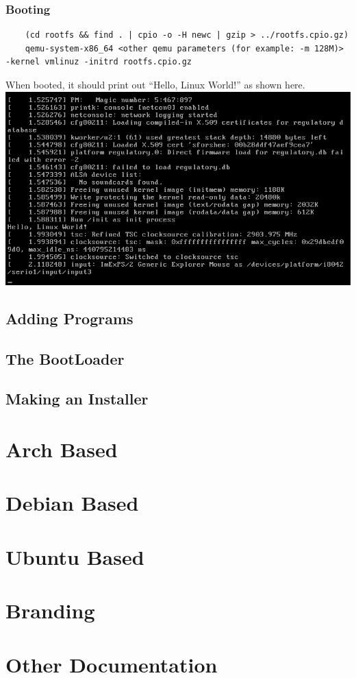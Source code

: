 \documentclass{article}
\begin{document}
			\subsubsection{Booting}
			\begin{lstlisting}
	(cd rootfs && find . | cpio -o -H newc | gzip > ../rootfs.cpio.gz)
	qemu-system-x86_64 <other qemu parameters (for example: -m 128M)> -kernel vmlinuz -initrd rootfs.cpio.gz
			\end{lstlisting}
			When booted, it should print out ``Hello, Linux World!'' as shown here.
			\\
			\includegraphics{HelloLinuxWorld.png}
		
		\subsection{Adding Programs}
		\subsection{The BootLoader}
		\subsection{Making an Installer}
\section{Arch Based}
\section{Debian Based}
\section{Ubuntu Based}
\section{Branding}
\section{Other Documentation}
\end{document}
